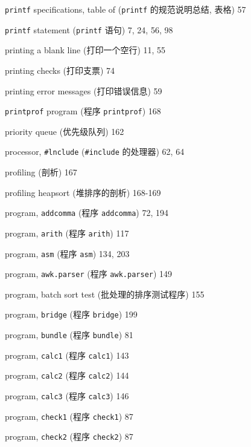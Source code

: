 \begin{multicols}{2}

\hangindent=2pc  \verb'printf' specifications, table of
(\verb'printf' 的规范说明总结, 表格) 57


\hangindent=2pc  \verb'printf' statement (\verb'printf' 语句)
7, 24, 56, 98

\hangindent=2pc  printing a blank line (打印一个空行) 11, 55

\hangindent=2pc  printing checks (打印支票) 74

\hangindent=2pc  printing error messages (打印错误信息) 59

\hangindent=2pc  \verb'printprof' program (程序
\verb'printprof') 168

\hangindent=2pc  priority queue (优先级队列) 162

\hangindent=2pc  processor, \verb'#lnclude' (\verb'#include'
的处理器) 62, 64

\hangindent=2pc  profiling (剖析) 167

\hangindent=2pc  profiling heapsort (堆排序的剖析) 168-169

\hangindent=2pc  program, \verb'addcomma' (程序 \verb'addcomma')
72, 194

\hangindent=2pc  program, \verb'arith' (程序 \verb'arith') 117

\hangindent=2pc  program, \verb'asm' (程序 \verb'asm') 134, 203

\hangindent=2pc  program, \verb'awk.parser' 
(程序 \verb'awk.parser') 149

\hangindent=2pc  program, batch sort test
(批处理的排序测试程序) 155

\hangindent=2pc  program, \verb'bridge' (程序 \verb'bridge') 199

\hangindent=2pc  program, \verb'bundle'  (程序 \verb'bundle') 81

\hangindent=2pc  program, \verb'calc1' (程序 \verb'calc1') 143

\hangindent=2pc  program, \verb'calc2' (程序 \verb'calc2') 144

\hangindent=2pc  program, \verb'calc3' (程序 \verb'calc3') 146

\hangindent=2pc  program, \verb'check1' (程序 \verb'check1') 87

\hangindent=2pc  program, \verb'check2' (程序 \verb'check2') 87


\end{multicols}
